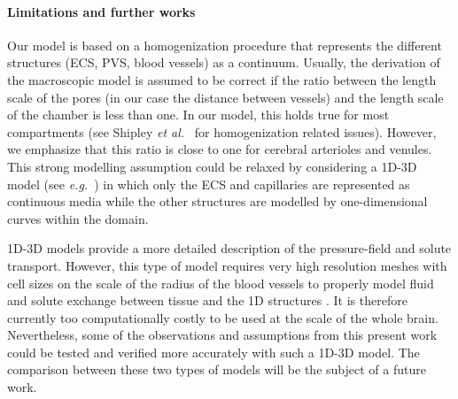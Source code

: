 \documentclass[a4paper,11pt]{article}
\newcommand{\eg}{\emph{e.g.}\;}
\newcommand{\etal}{\emph{et al.}\;}
\newcommand{\1}{^{(1)}}
\newcommand{\2}{^{(2)}}
\begin{document}
\paragraph{Limitations and further works}

Our model is based on a homogenization procedure that represents the different structures (ECS, PVS, blood vessels) as a continuum. %
Usually, the derivation of the macroscopic model is assumed to be correct if the ratio between the length scale of the pores (in our case the distance between vessels) and the length scale of the chamber is less than one. In our model, this holds true for most compartments (see Shipley \etal~\cite{shipley-four-comp} for homogenization related issues). However, we emphasize that this ratio is close to one for cerebral arterioles and venules. %
This strong modelling assumption could be relaxed by considering a 1D-3D model (see \eg~\cite{d2008coupling}) in which only the ECS and capillaries are represented as continuous media while the other structures are modelled by one-dimensional curves within the domain. 



1D-3D models provide a more detailed description of the pressure-field and solute transport. However, this type of model requires very high resolution meshes with cell sizes on the scale of the radius of the blood vessels to properly model fluid and solute exchange between tissue and the 1D structures \cite{gjerde2020singularity}. It is therefore currently too computationally costly to be used at the scale of the whole brain. Nevertheless, some of the observations and assumptions from this present work could be tested and verified more accurately with such a 1D-3D model. The comparison between these two types of models will be the subject of a future work.
\end{document}
